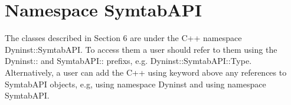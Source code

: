 \section{Namespace SymtabAPI}

The classes described in Section 6 are under the C++ namespace Dyninst::SymtabAPI. To access them a user should refer to them using the Dyninst:: and SymtabAPI:: prefixs, e.g. Dyninst::SymtabAPI::Type. Alternatively, a user can add the C++ using keyword above any references to SymtabAPI objects, e.g, using namespace Dyninst and using namespace SymtabAPI.

